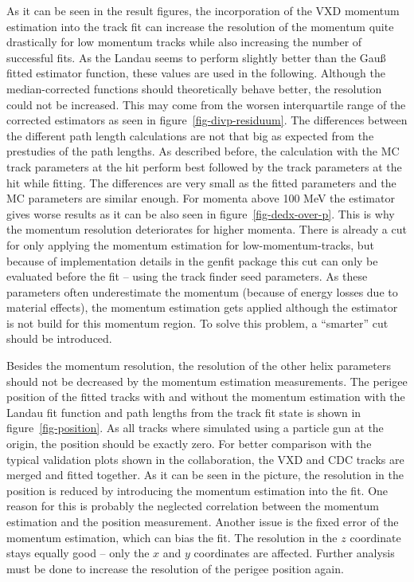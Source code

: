 As it can be seen in the result figures, the incorporation of the VXD momentum estimation into the track fit can increase the resolution of the momentum quite drastically for low momentum tracks while also increasing the number of successful fits. As the Landau seems to perform slightly better than the Gauß fitted estimator function, these values are used in the following. Although the median-corrected functions should theoretically behave better, the resolution could not be increased. This may come from the worsen interquartile range of the corrected estimators as seen in figure~\ref{fig-divp-residuum}. The differences between the different path length calculations are not that big as expected from the prestudies of the path lengths. As described before, the calculation with the MC track parameters at the hit perform best followed by the track parameters at the hit while fitting. The differences are very small as the fitted parameters and the MC parameters are similar enough. For momenta above 100 MeV the estimator gives worse results as it can be also seen in figure~\ref{fig-dedx-over-p}. This is why the momentum resolution deteriorates for higher momenta. There is already a cut for only applying the momentum estimation for low-momentum-tracks, but because of implementation details in the genfit package this cut can only be evaluated before the fit -- using the track finder seed parameters. As these parameters often underestimate the momentum (because of energy losses due to material effects), the momentum estimation gets applied although the estimator is not build for this momentum region. To solve this problem, a ``smarter'' cut should be introduced.

Besides the momentum resolution, the resolution of the other helix parameters should not be decreased by the momentum estimation measurements. The perigee position of the fitted tracks with and without the momentum estimation with the Landau fit function and path lengths from the track fit state is shown in figure~\ref{fig-position}. As all tracks where simulated using a particle gun at the origin, the position should be exactly zero. For better comparison with the typical validation plots shown in the collaboration, the VXD and CDC tracks are merged and fitted together. As it can be seen in the picture, the resolution in the position is reduced by introducing the momentum estimation into the fit. One reason for this is probably the neglected correlation between the momentum estimation and the position measurement. Another issue is the fixed error of the momentum estimation, which can bias the fit. The resolution in the $z$ coordinate stays equally good -- only the $x$ and $y$ coordinates are affected. Further analysis must be done to increase the resolution of the perigee position again.

